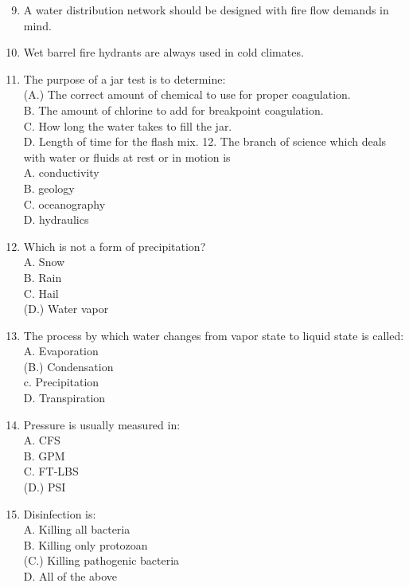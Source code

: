 \documentclass[10pt]{article}
\begin{document}
\begin{enumerate}
  \setcounter{enumi}{8}
  \item A water distribution network should be designed with fire flow demands in mind.

  \item Wet barrel fire hydrants are always used in cold climates.

  \item The purpose of a jar test is to determine:\\
(A.) The correct amount of chemical to use for proper coagulation.\\
B. The amount of chlorine to add for breakpoint coagulation.\\
C. How long the water takes to fill the jar.\\
D. Length of time for the flash mix. 12. The branch of science which deals with water or fluids at rest or in motion is\\
A. conductivity\\
B. geology\\
C. oceanography\\
D. hydraulics

  \item Which is not a form of precipitation?\\
A. Snow\\
B. Rain\\
C. Hail\\
(D.) Water vapor

  \item The process by which water changes from vapor state to liquid state is called:\\
A. Evaporation\\
(B.) Condensation\\
c. Precipitation\\
D. Transpiration

  \item Pressure is usually measured in:\\
A. CFS\\
B. GPM\\
C. FT-LBS\\
(D.) PSI

  \item Disinfection is:\\
A. Killing all bacteria\\
B. Killing only protozoan\\
(C.) Killing pathogenic bacteria\\
D. All of the above


\end{enumerate}
\end{document}
